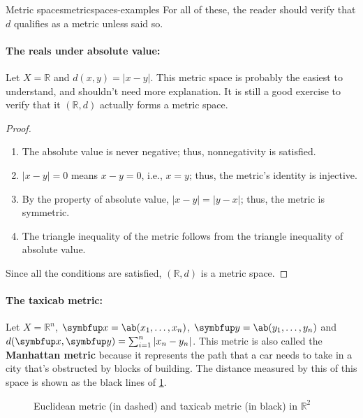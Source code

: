 \begin{exmp}{Metric spaces}{metricspaces-examples}
  For all of these, the reader should verify that \(d\) qualifies as a metric unless said so.

  \paragraph{The reals under absolute value:}

  Let \(X = \mathbb{R}\) and \(d(x, y) = |x - y|\). This metric space is probably
  the easiest to understand, and shouldn't need more explanation. It is still a good
  exercise to verify that it \((\mathbb{R}, d)\) actually forms a metric space.

  \begin{proof}
    \begin{enumerate}
      \item The absolute value is never negative; thus, nonnegativity is satisfied.
      \item \(|x - y| = 0\) means \(x - y = 0\), i.e., \(x = y\); thus, the metric's
            identity is injective.
      \item By the property of absolute value, \(|x - y| = |y - x|\); thus, the metric is symmetric.
      \item The triangle inequality of the metric follows from the triangle inequality
            of absolute value.
    \end{enumerate}
    Since all the conditions are satisfied, \((\mathbb{R}, d)\) is a metric space.
  \end{proof}

  \paragraph{The taxicab metric:}

  Let \(X = \mathbb{R}^n\), \(\vv{x} = \ab(x_1, \dots, x_n)\), \(\vv{y} = \ab(y_1, \dots, y_n)\) and
  \(d(\vv{x}, \vv{y}) = \sum_{i=1}^n |x_n - y_n|\). This metric is also called the \textbf{Manhattan
  metric} because it represents the path that a car needs to take in a city that's obstructed
  by blocks of building. The distance measured by this of this space is shown as the black
  lines of \cref{fig:metricspace-euclidean_taxicab_distance}. 
  \begin{figure}[H]
    \centering
    
    \caption{Euclidean metric (in dashed) and taxicab metric (in black) in \(\mathbb{R}^2\)}
    \label{fig:metricspace-euclidean_taxicab_distance}
  \end{figure}


\end{exmp}

